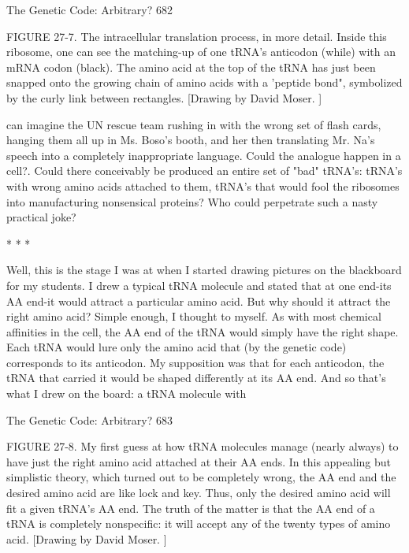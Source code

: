 The Genetic Code: Arbitrary?                                                           682

FIGURE 27-7. The intracellular translation process, in more detail. Inside this
ribosome, one can see the matching-up of one tRNA's anticodon (while) with an
mRNA codon (black). The amino acid at the top of the tRNA has just been snapped
onto the growing chain of amino acids with a 'peptide bond", symbolized by the curly
link between rectangles. [Drawing by David Moser. ]

can imagine the UN rescue team rushing in with the wrong set of flash cards, hanging
them all up in Ms. Boso's booth, and her then translating Mr. Na's speech into a
completely inappropriate language. Could the analogue happen in a cell?. Could there
conceivably be produced an entire set of "bad" tRNA's: tRNA's with wrong amino
acids attached to them, tRNA's that would fool the ribosomes into manufacturing
nonsensical proteins? Who could perpetrate such a nasty practical joke?

                                      *   *   *

         Well, this is the stage I was at when I started drawing pictures on the
blackboard for my students. I drew a typical tRNA molecule and stated that at one
end-its AA end-it would attract a particular amino acid. But why should it attract the
right amino acid? Simple enough, I thought to myself. As with most chemical
affinities in the cell, the AA end of the tRNA would simply have the right shape. Each
tRNA would lure only the amino acid that (by the genetic code) corresponds to its
anticodon. My supposition was that for each anticodon, the tRNA that carried it
would be shaped differently at its AA end. And so that's what I drew on the board: a
tRNA molecule with




The Genetic Code: Arbitrary?                                                      683

FIGURE 27-8. My first guess at how tRNA molecules manage (nearly always) to have
just the right amino acid attached at their AA ends. In this appealing but simplistic
theory, which turned out to be completely wrong, the AA end and the desired amino
acid are like lock and key. Thus, only the desired amino acid will fit a given tRNA's
AA end. The truth of the matter is that the AA end of a tRNA is completely
nonspecific: it will accept any of the twenty types of amino acid. [Drawing by David
Moser. ]

